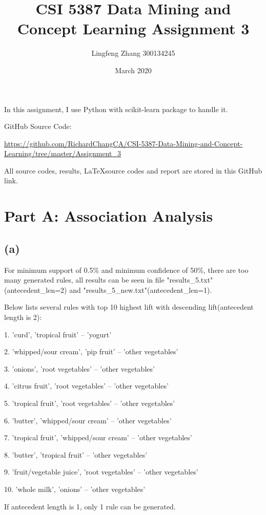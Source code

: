 \documentclass{article}
\title{CSI 5387 Data Mining and Concept Learning Assignment 3}
\author{Lingfeng Zhang 300134245}
\date{March 2020}
\begin{document}
\maketitle

In this assignment, I use Python with scikit-learn package to handle it.

GitHub Source Code:

\href{https://github.com/RichardChangCA/CSI-5387-Data-Mining-and-Concept-Learning/tree/master/Assignment_3}{\url{https://github.com/RichardChangCA/CSI-5387-Data-Mining-and-Concept-Learning/tree/master/Assignment_3}}

All source codes, results, \LaTeX source codes and report are stored in this GitHub link.

\section{Part A: Association Analysis}

\subsection{(a)}

For minimum support of 0.5\% and minimum confidence of 50\%, there are too many generated rules, all results can be seen in file "results\_5.txt"(antecedent\_len=2) and "results\_5\_new.txt"(antecedent\_len=1).

Below lists several rules with top 10 highest lift with descending lift(antecedent length is 2):

1. 'curd', 'tropical fruit' -- 'yogurt'

2. 'whipped/sour cream', 'pip fruit' -- 'other vegetables'

3. 'onions', 'root vegetables' -- 'other vegetables'

4. 'citrus fruit', 'root vegetables' -- 'other vegetables'

5. 'tropical fruit', 'root vegetables' -- 'other vegetables'

6. 'butter', 'whipped/sour cream' -- 'other vegetables'

7. 'tropical fruit', 'whipped/sour cream' -- 'other vegetables'

8. 'butter', 'tropical fruit' -- 'other vegetables'

9. 'fruit/vegetable juice', 'root vegetables' -- 'other vegetables'

10. 'whole milk', 'onions' -- 'other vegetables'

If antecedent length is 1, only 1 rule can be generated.
\end{document}
